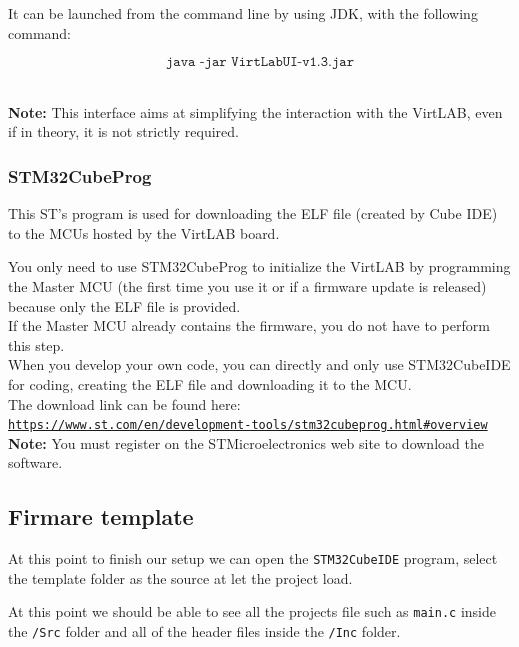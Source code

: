 \documentclass[../main.tex]{subfiles}
\begin{document}
It can be launched from the command line by using JDK, with the following command:

\[ \texttt{java -jar VirtLabUI-v1.3.jar} \]\

\textbf{Note:} This interface aims at simplifying the interaction with the VirtLAB, even if in theory, it is not strictly required.



\subsubsection*{STM32CubeProg}


This ST’s program is used for downloading the ELF file (created by Cube IDE) to the MCUs hosted by the VirtLAB board.

You only need to use STM32CubeProg to initialize the VirtLAB by programming the Master MCU (the first time you use it or if a firmware update is released) because only the ELF file is provided.\\

If the Master MCU already contains the firmware, you do not have to perform this
step. \\

When you develop your own code, you can directly and only use STM32CubeIDE for coding, creating the ELF file and downloading it to the MCU.\\


The download link can be found here: \\

\href{https://www.st.com/en/development-tools/stm32cubeprog.html#overview}{\texttt{https://www.st.com/en/development-tools/stm32cubeprog.html\#overview}}\\


\textbf{Note:} You must register on the STMicroelectronics web site to download the software.



\subsection{Firmare template}

At this point to finish our setup we can open the \texttt{STM32CubeIDE} program, select the template folder as the source at let the project load.

At this point we should be able to see all the projects file such as \texttt{main.c} inside the \texttt{/Src} folder and all of the header files inside the \texttt{/Inc} folder. \\
\end{document}
